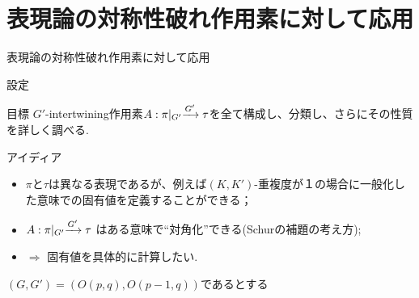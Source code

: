 \documentclass[pdf,notes]{beamer}
\renewcommand{\implies}{\Rightarrow}
\begin{document}
\section{表現論の対称性破れ作用素に対して応用}
\newcommand{\mysbo}{A:\pi\kern-0.1cm\mid_{G'}\xrightarrow{G'}\tau}
{
	\begin{frame}{表現論の対称性破れ作用素に対して応用}
	\begin{block}{設定}
		
	\centerline{
		\xymatrixcolsep{0.5pc}
		\xymatrixrowsep{1pc}
		}
	\end{block}
	\hspace{1cm}
	\vspace{-0.5cm}
	\begin{block}{目標}
		$G'$-intertwining作用素$\mysbo$を全て構成し、分類し、さらにその性質を詳しく調べる.
	\end{block}
\end{frame}
\begin{frame}{アイディア}
	\begin{itemize}%
		\item $\pi$と$\tau$は異なる表現であるが、例えば$(K,K')$-重複度が１の場合に一般化した意味での固有値を定義することができる；
		\item $\mysbo$ はある意味で``対角化''できる(Schurの補題の考え方);
		\item $\implies$ 固有値を具体的に計算したい.
	\end{itemize}
\end{frame}
}
\begin{frame}{$(G,G')=\left( O(p,q),O(p-1,q) \right)$であるとする}
\begin{center}
	\begin{tikzpicture}[rotate=-90]
	
	\end{tikzpicture}
\end{center}
\end{frame}
\end{document}
